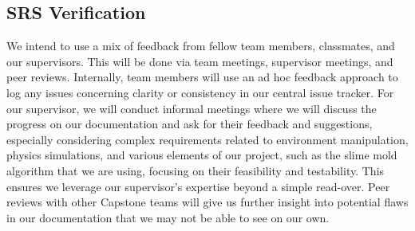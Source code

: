 \documentclass[12pt, titlepage]{article}
\begin{document}
\subsection{SRS Verification}

We intend to use a mix of feedback from fellow team members, classmates, and our supervisors.
This will be done via team meetings, supervisor meetings, and peer reviews. Internally,
team members will use an ad hoc feedback approach to log any issues concerning clarity
or consistency in our central issue tracker. For our supervisor, we will conduct informal meetings
where we will discuss the progress on our documentation and ask for their feedback and suggestions,
especially considering complex requirements related to environment manipulation, physics
simulations, and various elements of our project, such as the slime mold algorithm
that we are using, focusing on their feasibility and testability. This ensures we leverage
our supervisor's expertise beyond a simple read-over. Peer reviews with other Capstone teams
will give us further insight into potential flaws in our documentation that we may not be able
to see on our own.
\end{document}
